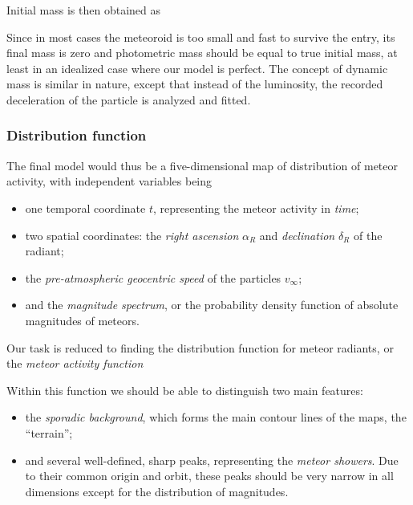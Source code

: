             Initial mass is then obtained as

            Since in most cases the meteoroid is too small and fast to survive the entry, its final mass is zero
            and photometric mass should be equal to true initial mass, at least in an idealized case where our model is perfect.
            The concept of dynamic mass is similar in nature, except that instead of the luminosity,
            the recorded deceleration of the particle is analyzed and fitted.

        \subsubsection{Distribution function} \label{mspd}
            The final model would thus be a five-dimensional map of distribution of meteor activity, with independent variables being
            \begin{itemize}
                \item one temporal coordinate $t$, representing the meteor activity in \emph{time};
                \item two spatial coordinates: the \emph{right ascension} $\alpha_R$ and \emph{declination} $\delta_R$ of the radiant;
                \item the \emph{pre-atmospheric geocentric speed} of the particles $v_\infty$;
                \item and the \emph{magnitude spectrum}, or the probability density function of absolute magnitudes of meteors.
            \end{itemize}

            Our task is reduced to finding the distribution function for meteor radiants, or the \emph{meteor activity function}

            Within this function we should be able to distinguish two main features:
            \begin{itemize}
                \item the \emph{sporadic background}, which forms the main contour lines of the maps, the ``terrain'';
                \item and several well-defined, sharp peaks, representing the \emph{meteor showers}.
                    Due to their common origin and orbit, these peaks should be very narrow in all dimensions
                    except for the distribution of magnitudes.
            \end{itemize}

